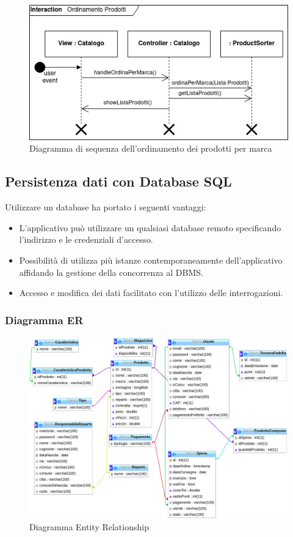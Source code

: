 \documentclass{article}
\begin{document}
\begin{figure}[h!]
	\centering
	\includegraphics[width=\textwidth]{SDSorting.jpg}
	\caption{Diagramma di sequenza dell'ordinamento dei prodotti per marca}
	\label{fig:SDSorting}
\end{figure}

\clearpage
\subsection{Persistenza dati con Database SQL}
Utilizzare un database ha portato i seguenti vantaggi:
\begin{itemize}
	\item{
	      L'applicativo può utilizzare un qualsiasi database remoto specificando l'indirizzo e le credenziali d'accesso.}

	\item{
	      Possibilità di utilizza più istanze contemporaneamente dell'applicativo affidando la gestione
	      della concorrenza al DBMS.}
	\item{
	      Accesso e modifica dei dati facilitato con l'utilizzo delle interrogazioni.}
\end{itemize}

\subsubsection{Diagramma ER}
\begin{figure}[h!]
	\centering
	\includegraphics[width=\textwidth]{DiagrammaER.png}
	\caption{Diagramma Entity Relationship}
	\label{fig:DiagrammaER}
\end{figure}
\newpage
\end{document}
